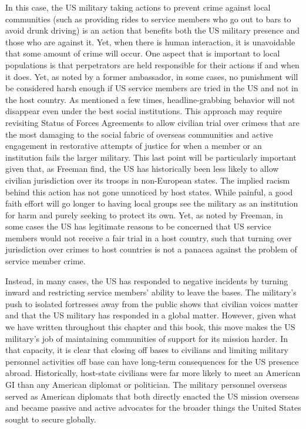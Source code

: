 In this case, the US military taking actions to prevent crime against local communities (such as providing rides to service members who go out to bars to avoid drunk driving) is an action that benefits both the US military presence and those who are against it. Yet, when there is human interaction, it is unavoidable that some amount of crime will occur. One aspect that is important to local populations is that perpetrators are held responsible for their actions if and when it does. Yet, as noted by a former ambassador, in some cases, no punishment will be considered harsh enough if US service members are tried in the US and not in the host country. As mentioned a few times, headline-grabbing behavior will not disappear even under the best social institutions. This approach may require revisiting Status of Forces Agreements to allow civilian trial over crimess that are the most damaging to the social fabric of overseas communities and active engagement in restorative attempts of justice for when a member or an institution fails the larger military.\cite{efrat2021a,Freeman2021} This last point will be particularly important given that, as Freeman find, the US has historically been less likely to allow civilian jurisdiction over its troops in non-European states. The implied racism behind this action has not gone unnoticed by host states. While painful, a good faith effort will go longer to having local groups see the military as an institution for harm and purely seeking to protect its own.\cite{Freeman2021} Yet, as noted by Freeman, in some cases the US has legitimate reasons to be concerned that US service members would not receive a fair trial in a host country, such that turning over jurisdiction over crimes to host countries is not a panacea against the problem of service member crime. \cite{Freeman2021} 

Instead, in many cases, the US has responded to negative incidents by turning inward and restricting service members' ability to leave the bases. The military's push to isolated fortresses away from the public shows that civilian voices matter and that the US military has responded in a global matter. However, given what we have written throughout this chapter and this book, this move makes the US military's job of maintaining communities of support for its mission harder. In that capacity, it is clear that closing off bases to civilians and limiting military personnel activities off base can have long-term consequences for the US presence abroad. Historically, host-state civilians were far more likely to meet an American GI than any American diplomat or politician. The military personnel overseas served as American diplomats that both directly enacted the US mission overseas and became passive and active advocates for the broader things the United States sought to secure globally. 

